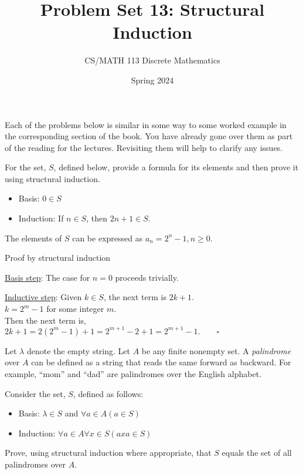 \documentclass[a4paper]{exam}
\title{Problem Set 13: Structural Induction}
\author{CS/MATH 113 Discrete Mathematics}
\date{Spring 2024}
\begin{document}
\maketitle

Each of the problems below is similar in some way to some worked example in the corresponding section of the book. You have already gone over them as part of the reading for the lectures. Revisiting them will help to clarify any issues.

\begin{questions}

\question For the set, $S$, defined below, provide a formula for its elements and then prove it using structural induction.
  \begin{itemize}
  \item Basis: $0 \in S$
  \item Induction: If $n \in S$, then $2n+1 \in S$.
  \end{itemize}

  \begin{solution}
    The elements of $S$ can be expressed as $a_n = 2^n - 1, n \ge 0$.

    Proof by structural induction
    
    \underline{Basis step}: The case for $n = 0$ proceeds trivially.
    
    \underline{Inductive step}: Given $k\in S$, the next term is $2k+1$.\\
    $k=2^m-1$ for some integer $m$.\\
    Then the next term is, $2k+1= 2(2^m-1)+1 = 2^{m+1} -2 + 1 =2^{m+1} -1.\qquad\square$ 
  \end{solution}
  
\question Let $\lambda$ denote the empty string. Let $A$ be any finite nonempty set. A \textit{palindrome} over $A$ can be defined as a string that reads the same forward as backward. For example, ``mom'' and ``dad'' are palindromes over the English alphabet.

  Consider the set, $S$, defined as follows:
  \begin{itemize}
  \item Basis: $\lambda \in S$ and $\forall a \in A (a \in S)$
  \item Induction: $\forall a \in A\forall x \in S (axa \in S)$
  \end{itemize}

  Prove, using structural induction where appropriate, that $S$ equals the set of all palindromes over $A$.


\end{questions}
\end{document}
